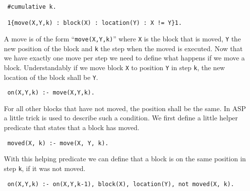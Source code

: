 \documentclass[a4paper,10pt]{article}
\begin{document}
\begin{verbatim}
 #cumulative k.

 1{move(X,Y,k) : block(X) : location(Y) : X != Y}1.
\end{verbatim}
A move is of the form ``\texttt{move(X,Y,k)}'' where \texttt{X} is the block that is moved, \texttt{Y} the new position of the block and \texttt{k} the step when the moved is executed.
\newline
Now that we have exactly one move per step we need to define what happens if we move a block.
Understandably if we move block \texttt{X} to position \texttt{Y} in step \texttt{k}, the new location of the block shall be \texttt{Y}.
\begin{verbatim}
 on(X,Y,k) :- move(X,Y,k).
\end{verbatim}
For all other blocks that have not moved, the position shall be the same.
In ASP a little trick is used to describe such a condition.
We first define a little helper predicate that states that a block has moved.
\begin{verbatim}
 moved(X, k) :- move(X, Y, k).
\end{verbatim}
With this helping predicate we can define that a block is on the same position in step \texttt{k}, if it was not moved.
\begin{verbatim}
 on(X,Y,k) :- on(X,Y,k-1), block(X), location(Y), not moved(X, k).
\end{verbatim}
\end{document}
